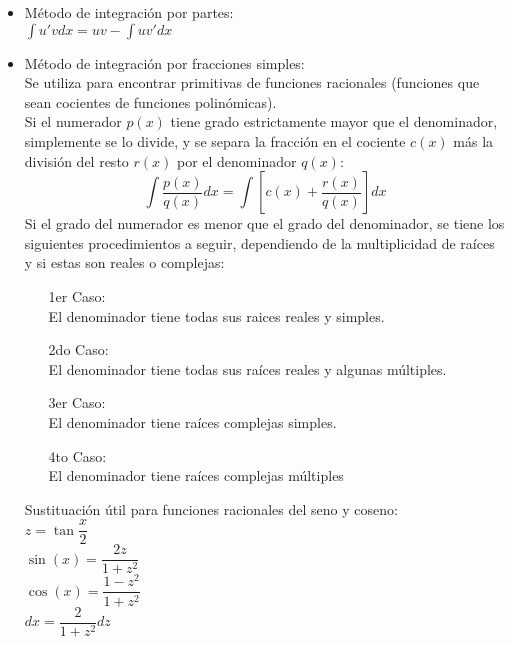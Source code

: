 \documentclass[a4paper,11pt]{report}
\begin{document}
\begin{itemize}
\begin{itemize}
\item Método de integración por partes: \\
$\int u'v dx = uv - \int uv' dx$ \\
\item Método de integración por fracciones simples: \\
Se utiliza para encontrar primitivas de funciones racionales (funciones que sean cocientes de funciones polinómicas). \\
Si el numerador $p(x)$ tiene grado estrictamente mayor que el denominador, simplemente se lo divide, y se separa la fracción en el cociente $c(x)$ más la división del resto $r(x)$ por el denominador $q(x)$:
$$ \int \dfrac{p(x)}{q(x)} dx = \int \left[c(x) + \dfrac{r(x)}{q(x)}\right] dx$$
Si el grado del numerador es menor que el grado del denominador, se tiene los siguientes procedimientos a seguir, dependiendo de la multiplicidad de raíces y si estas son reales o complejas:
\begin{itemize}
\item[1er] Caso: \\
El denominador tiene todas sus raices reales y simples.\\
\item[2do] Caso:\\
El denominador tiene todas sus raíces reales y algunas múltiples.\\
\item[3er] Caso: \\
El denominador tiene raíces complejas simples.\\
\item[4to] Caso: \\
El denominador tiene raíces complejas múltiples\\
\end{itemize}
Sustituación útil para funciones racionales del seno y coseno: \\
$z=\tan \dfrac{x}{2}$ \\
$\sin (x) = \dfrac{2z}{1+z^2}$ \\
$\cos (x) = \dfrac{1-z^2}{1+z^2}$ \\
$dx = \dfrac{2}{1+z^2}dz$ 
\end{itemize}
\end{itemize}
\end{document}
